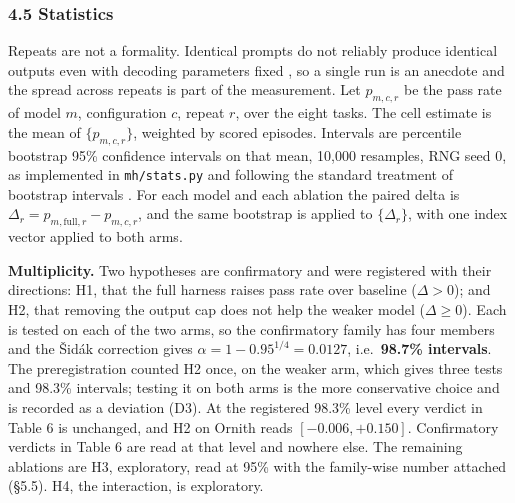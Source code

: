 \documentclass[
  10pt,
  a4paper,
]{article}
\let\oldtexttt\texttt
\renewcommand{\texttt}[1]{{\small\oldtexttt{#1}}}
\begin{document}
\subsubsection{4.5 Statistics}\label{statistics}

Repeats are not a formality. Identical prompts do not reliably produce
identical outputs even with decoding parameters fixed
\citep{nicholson2026drift}, so a single run is an anecdote and the
spread across repeats is part of the measurement. Let \(p_{m,c,r}\) be
the pass rate of model \(m\), configuration \(c\), repeat \(r\), over
the eight tasks. The cell estimate is the mean of \(\{p_{m,c,r}\}\),
weighted by scored episodes. Intervals are percentile bootstrap 95\%
confidence intervals on that mean, 10,000 resamples, RNG seed 0, as
implemented in \texttt{mh/stats.py} and following the standard treatment
of bootstrap intervals \citep{diciccio1996bootstrap}. For each model and
each ablation the paired delta is
\(\Delta_r = p_{m,\text{full},r} - p_{m,c,r}\), and the same bootstrap
is applied to \(\{\Delta_r\}\), with one index vector applied to both
arms.

\textbf{Multiplicity.} Two hypotheses are confirmatory and were
registered with their directions: H1, that the full harness raises pass
rate over baseline (\(\Delta > 0\)); and H2, that removing the output
cap does not help the weaker model (\(\Delta \geq 0\)). Each is tested
on each of the two arms, so the confirmatory family has four members and
the Šidák correction gives \(\alpha = 1 - 0.95^{1/4} = 0.0127\),
i.e.~\textbf{98.7\% intervals}. The preregistration counted H2 once, on
the weaker arm, which gives three tests and 98.3\% intervals; testing it
on both arms is the more conservative choice and is recorded as a
deviation (D3). At the registered 98.3\% level every verdict in Table 6
is unchanged, and H2 on Ornith reads \([-0.006, +0.150]\). Confirmatory
verdicts in Table 6 are read at that level and nowhere else. The
remaining ablations are H3, exploratory, read at 95\% with the
family-wise number attached (§5.5). H4, the interaction, is exploratory.
\end{document}
